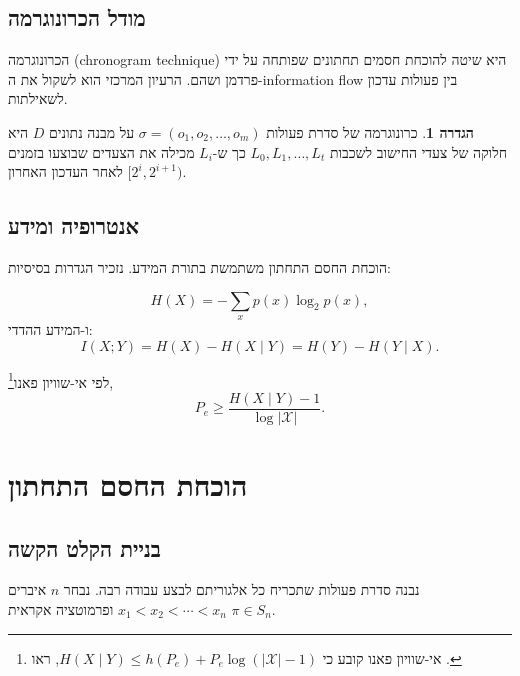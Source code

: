 \documentclass[12pt,a4paper]{article}
\theoremstyle{plain}
\theoremstyle{definition}
\newtheorem{definition}[theorem]{הגדרה}
\theoremstyle{remark}
\begin{document}
\subsection{מודל הכרונוגרמה}

הכרונוגרמה (chronogram technique) היא שיטה להוכחת חסמים
תחתונים שפותחה על ידי פרדמן ושהם. הרעיון המרכזי הוא
לשקול את ה-information flow בין פעולות עדכון לשאילתות.

\begin{definition}
\label{def:chronogram}
כרונוגרמה של סדרת פעולות $\sigma = (o_1, o_2, \ldots, o_m)$
על מבנה נתונים $D$ היא חלוקה של צעדי החישוב לשכבות
$L_0, L_1, \ldots, L_t$ כך ש-$L_i$ מכילה את הצעדים
שבוצעו בזמנים $[2^i, 2^{i+1})$ לאחר העדכון האחרון.
\end{definition}

\subsection{אנטרופיה ומידע}

הוכחת החסם התחתון משתמשת בתורת המידע. נזכיר הגדרות בסיסיות:

\begin{equation}
\label{eq:entropy}
H(X) = -\sum_{x} p(x) \log_2 p(x),
\end{equation}
ו-המידע ההדדי:
\begin{equation}
\label{eq:mutual_info}
I(X; Y) = H(X) - H(X \mid Y) = H(Y) - H(Y \mid X).
\end{equation}

לפי אי-שוויון פאנו\footnote{%
אי-שוויון פאנו קובע כי $H(X \mid Y) \leq h(P_e) + P_e \log(|\mathcal{X}| - 1)$,
ראו \citet{cover2006}.},
\begin{equation}
\label{eq:fano}
P_e \geq \frac{H(X \mid Y) - 1}{\log |\mathcal{X}|}.
\end{equation}

\section{הוכחת החסם התחתון}
\label{sec:lower}

\subsection{בניית הקלט הקשה}

נבנה סדרת פעולות שתכריח כל אלגוריתם לבצע עבודה רבה.
נבחר $n$ איברים $x_1 < x_2 < \cdots < x_n$ ופרמוטציה
אקראית $\pi \in S_n$.
\end{document}
